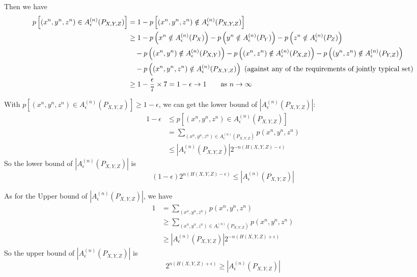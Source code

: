 Then we have
\begin{align*}
p\left[\left(x^n,y^n,z^n\right)\in A_{\epsilon}^{(n)}(P_{X,Y,Z})\right] &= 1 - p\left[\left(x^n,y^n,z^n\right)\notin A_{\epsilon}^{(n)}(P_{X,Y,Z})\right] \\
&\geq 1 - p\left(x^n\notin A_{\epsilon}^{(n)}(P_X)\right) - p\left(y^n\notin A_{\epsilon}^{(n)}(P_Y)\right) - p\left(z^n\notin A_{\epsilon}^{(n)}(P_Z)\right) \\
&\quad - p\left(\left(x^n,y^n\right)\notin A_{\epsilon}^{(n)}(P_{X,Y})\right) - p\left(\left(x^n,z^n\right)\notin A_{\epsilon}^{(n)}(P_{X,Z})\right) - p\left(\left(y^n,z^n\right)\notin A_{\epsilon}^{(n)}(P_{Y,Z})\right) \\
&\quad - p\left(\left(x^n,y^n,z^n\right)\notin A_{\epsilon}^{(n)}(P_{X,Y,Z})\right) \text{\ (against any of the requirements of jointly typical set)} \\
&\geq 1 - \dfrac{\epsilon}{7}\times 7 = 1 - \epsilon \to 1 \text{\qquad as } n\to\infty
\end{align*}

With $p\left[\left(x^n,y^n,z^n\right)\in A_{\epsilon}^{(n)}(P_{X,Y,Z})\right]\geq 1-\epsilon$, we can get the lower bound of $\left|A_{\epsilon}^{(n)}(P_{X,Y,Z})\right|$:
\begin{align*}
1-\epsilon &\leq p\left[\left(x^n,y^n,z^n\right)\in A_{\epsilon}^{(n)}(P_{X,Y,Z})\right] \\
&= \sum_{\left(x^n,y^n,z^n\right)\in A_{\epsilon}^{(n)}(P_{X,Y,Z})} p\left(x^n,y^n,z^n\right) \\
&\leq \left|A_{\epsilon}^{(n)}(P_{X,Y,Z})\right| 2^{-n(H(X,Y,Z)-\epsilon)}
\end{align*}
So the lower bound of $\left|A_{\epsilon}^{(n)}(P_{X,Y,Z})\right|$ is
$$(1-\epsilon)2^{n(H(X,Y,Z)-\epsilon)}\leq \left|A_{\epsilon}^{(n)}(P_{X,Y,Z})\right|$$

As for the Upper bound of $\left|A_{\epsilon}^{(n)}(P_{X,Y,Z})\right|$, we have
\begin{align*}
1 &= \sum_{\left(x^n,y^n,z^n\right)} p\left(x^n,y^n,z^n\right) \\
&\geq \sum_{\left(x^n,y^n,z^n\right)\in A_{\epsilon}^{(n)}(P_{X,Y,Z})} p\left(x^n,y^n,z^n\right) \\
&\geq \left|A_{\epsilon}^{(n)}(P_{X,Y,Z})\right| 2^{-n(H(X,Y,Z)+\epsilon)}
\end{align*}
So the upper bound of $\left|A_{\epsilon}^{(n)}(P_{X,Y,Z})\right|$ is
$$2^{n(H(X,Y,Z)+\epsilon)}\geq \left|A_{\epsilon}^{(n)}(P_{X,Y,Z})\right|$$

